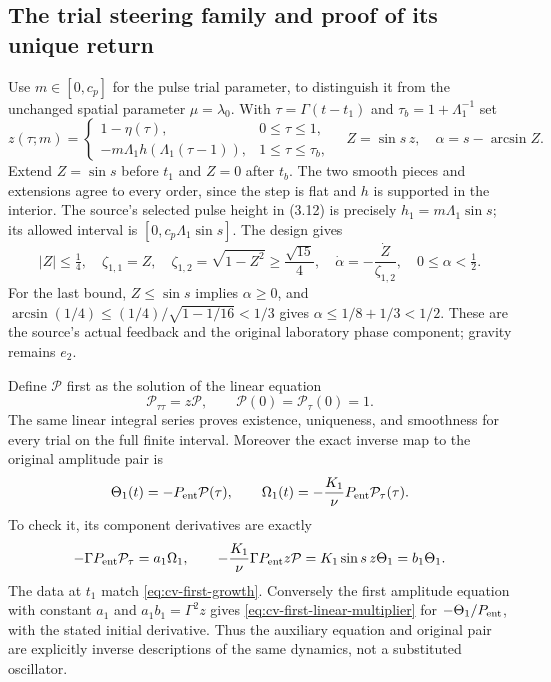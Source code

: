 \subsection{The trial steering family and proof of its unique return}

Use $m\in[0,c_p]$ for the pulse trial parameter, to distinguish it
from the unchanged spatial parameter $\mu=\lambda_0$.
With $\tau=\Gamma(t-t_1)$ and $\tau_b=1+\Lambda_1^{-1}$ set
\begin{equation}
 z(\tau;m)=
 \begin{cases}
  1-\eta(\tau),&0\leq\tau\leq1,\\
  -m\Lambda_1h(\Lambda_1(\tau-1)),&1\leq\tau\leq\tau_b,
 \end{cases}
 \quad Z=\sin s\,z,\quad \alpha=s-\arcsin Z.
 \label{eq:cv-first-Z}
\end{equation}
Extend $Z=\sin s$ before $t_1$ and $Z=0$ after $t_b$.
The two smooth pieces and extensions agree to every order, since the
step is flat and $h$ is supported in the interior.
The source's selected pulse height in (3.12) is precisely
$h_1=m\Lambda_1\sin s$; its allowed interval is
$[0,c_p\Lambda_1\sin s]$.
The design gives
\begin{equation}
 |Z|\leq\tfrac14,\quad
 \zeta_{1,1}=Z,\quad
 \zeta_{1,2}=\sqrt{1-Z^2}\geq\frac{\sqrt{15}}4,\quad
 \dot\alpha=-\frac{\dot Z}{\zeta_{1,2}},\quad 0\leq\alpha<\tfrac12.
 \label{eq:cv-first-control}
\end{equation}
For the last bound, $Z\leq\sin s$ implies $\alpha\geq0$, and
$\arcsin(1/4)\leq(1/4)/\sqrt{1-1/16}<1/3$ gives
$\alpha\leq1/8+1/3<1/2$. These are the source's actual feedback and
the original laboratory phase component; gravity remains $e_2$.

Define $\mathcal P$ first as the solution of the linear equation
\begin{equation}
 \mathcal P_{\tau\tau}=z\mathcal P,\qquad
 \mathcal P(0)=\mathcal P_\tau(0)=1.
 \label{eq:cv-first-linear-multiplier}
\end{equation}
The same linear integral series proves existence, uniqueness, and
smoothness for every trial on the full finite interval. Moreover the
exact inverse map to the original amplitude pair is
\begin{equation}
 \Theta_1(t)=-P_{\rm ent}\mathcal P(\tau),\qquad
 \Omega_1(t)=-\frac{K_1}{\nu}P_{\rm ent}\mathcal P_\tau(\tau).
 \label{eq:cv-first-inverse-map}
\end{equation}
To check it, its component derivatives are exactly
\[
 -\Gamma P_{\rm ent}\mathcal P_\tau=a_1\Omega_1,\qquad
 -\frac{K_1}{\nu}\Gamma P_{\rm ent}z\mathcal P
 =K_1\sin s\,z\Theta_1=b_1\Theta_1.
\]
The data at $t_1$ match \eqref{eq:cv-first-growth}. Conversely the
first amplitude equation with constant $a_1$ and $a_1b_1=\Gamma^2z$
gives \eqref{eq:cv-first-linear-multiplier} for
$-\Theta_1/P_{\rm ent}$, with the stated initial derivative.
Thus the auxiliary equation and original pair are explicitly inverse
descriptions of the same dynamics, not a substituted oscillator.

